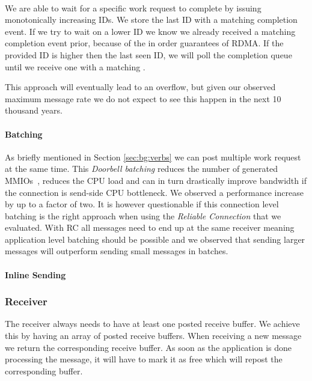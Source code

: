\paragraph{} We are able to wait for a specific work request to complete by issuing monotonically increasing IDs. We store the
last ID with a matching completion event. If we try to wait on a lower ID we know we already received a matching completion 
event prior, because of the in order guarantees of RDMA. If the provided ID is higher then the
last seen ID, we will poll the completion queue until we receive one with a matching .

This approach will eventually lead to an overflow, but given our observed maximum message rate we do not expect to see this 
happen in the next 10 thousand years.


\paragraph{Batching} As briefly mentioned in Section \ref{sec:bg:verbs} we can post multiple work request at the same time. 
This \emph{Doorbell batching} reduces the number of generated MMIOs~\cite{anuj-guide}, reduces the CPU load and can in turn 
drastically improve bandwidth if the connection is send-side CPU bottleneck. We observed a performance increase by up to 
a factor of two. It is however questionable if this connection level batching is the right approach when using the 
\emph{Reliable Connection} that we evaluated. With RC all messages need to end up at the same receiver meaning application 
level batching should be possible and we observed that sending larger messages will outperform sending small messages in 
batches.

\paragraph{Inline Sending} 

\subsubsection{Receiver}

The receiver always needs to have at least one posted receive buffer. We achieve this by having an array of posted receive 
buffers. When receiving a new message we return the corresponding receive buffer. As soon as the application is done processing
the message, it will have to mark it as free which will repost the corresponding buffer.

